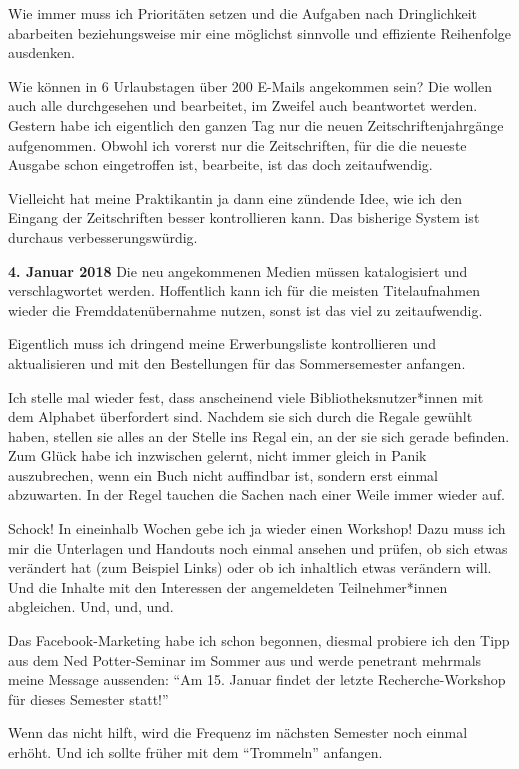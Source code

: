 \documentclass[a4paper,
fontsize=11pt,
oneside,
numbers=noperiodatend,
parskip=half-,
bibliography=totoc,
final
]{scrartcl}
\begin{document}
Wie immer muss ich Prioritäten setzen und die Aufgaben nach
Dringlichkeit abarbeiten beziehungsweise mir eine möglichst sinnvolle
und effiziente Reihenfolge ausdenken.

Wie können in 6 Urlaubstagen über 200 E-Mails angekommen sein? Die
wollen auch alle durchgesehen und bearbeitet, im Zweifel auch
beantwortet werden. Gestern habe ich eigentlich den ganzen Tag nur die
neuen Zeitschriftenjahrgänge aufgenommen. Obwohl ich vorerst nur die
Zeitschriften, für die die neueste Ausgabe schon eingetroffen ist,
bearbeite, ist das doch zeitaufwendig.

Vielleicht hat meine Praktikantin ja dann eine zündende Idee, wie ich
den Eingang der Zeitschriften besser kontrollieren kann. Das bisherige
System ist durchaus verbesserungswürdig.

\textbf{4. Januar 2018} Die neu angekommenen Medien müssen katalogisiert
und verschlagwortet werden. Hoffentlich kann ich für die meisten
Titelaufnahmen wieder die Fremddatenübernahme nutzen, sonst ist das viel
zu zeitaufwendig.

Eigentlich muss ich dringend meine Erwerbungsliste kontrollieren und
aktualisieren und mit den Bestellungen für das Sommersemester anfangen.

Ich stelle mal wieder fest, dass anscheinend viele
Bibliotheksnutzer*innen mit dem Alphabet überfordert sind. Nachdem sie
sich durch die Regale gewühlt haben, stellen sie alles an der Stelle ins
Regal ein, an der sie sich gerade befinden. Zum Glück habe ich
inzwischen gelernt, nicht immer gleich in Panik auszubrechen, wenn ein
Buch nicht auffindbar ist, sondern erst einmal abzuwarten. In der Regel
tauchen die Sachen nach einer Weile immer wieder auf.

Schock! In eineinhalb Wochen gebe ich ja wieder einen Workshop! Dazu
muss ich mir die Unterlagen und Handouts noch einmal ansehen und prüfen,
ob sich etwas verändert hat (zum Beispiel Links) oder ob ich inhaltlich
etwas verändern will. Und die Inhalte mit den Interessen der
angemeldeten Teilnehmer*innen abgleichen. Und, und, und.

Das Facebook-Marketing habe ich schon begonnen, diesmal probiere ich den
Tipp aus dem Ned Potter-Seminar im Sommer aus und werde penetrant
mehrmals meine Message aussenden: \enquote{Am 15. Januar findet der
letzte Recherche-Workshop für dieses Semester statt!}

Wenn das nicht hilft, wird die Frequenz im nächsten Semester noch einmal
erhöht. Und ich sollte früher mit dem \enquote{Trommeln} anfangen.
\end{document}

